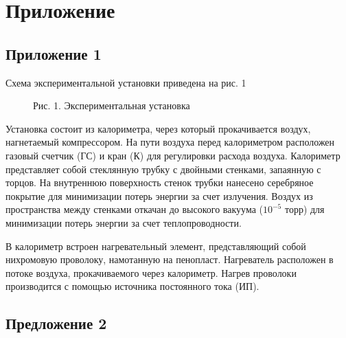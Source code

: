 \section{Приложение} \label{Приложение}

\subsection{Приложение 1} \label{Приложение 1}
Схема экспериментальной установки приведена на рис. 1
\begin{figure}[ht]
    \begin{center}       
        Рис. 1. Экспериментальная установка
    \end{center}
\end{figure}

Установка состоит из калориметра, через который прокачивается воздух, нагнетаемый компрессором. На пути воздуха перед калориметром расположен газовый счетчик (ГС) и кран (К) для регулировки расхода воздуха. Калориметр представляет собой стеклянную трубку с двойными стенками, запаянную с торцов. На внутреннюю поверхность стенок трубки нанесено серебряное покрытие для минимизации потерь энергии за счет излучения. Воздух из пространства между стенками откачан до высокого вакуума ($10^{-5}$ торр) для минимизации потерь энергии за счет теплопроводности. 

В калориметр встроен нагревательный элемент, представляющий собой нихромовую проволоку, намотанную на пенопласт. Нагреватель расположен в потоке воздуха, прокачиваемого через калориметр. Нагрев проволоки производится с помощью источника постоянного тока (ИП).

\subsection{Предложение 2} \label{Приложение 2}

